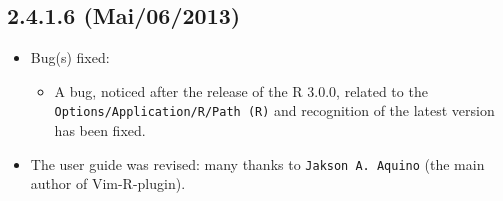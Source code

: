 \subsection*{2.4.1.6 (Mai/06/2013)}
\begin{itemize}
  \item Bug(s) fixed:
    \begin{itemize}
      \item A bug, noticed after the release of the R 3.0.0, related to the \texttt{Options/Application/R/Path (R)}
       and recognition of the latest version has been fixed.
    \end{itemize}
  \item The user guide was revised: many thanks to \texttt{Jakson A. Aquino} (the main author of Vim-R-plugin).
\end{itemize}
